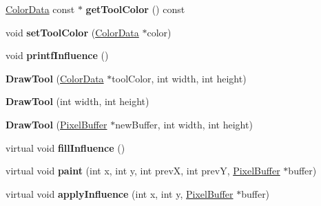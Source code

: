 \begin{DoxyCompactItemize}
\item 
\hypertarget{classDrawTool_ac19eb962a24f0bd60b0854079424c7ec}{\hyperlink{classColorData}{Color\-Data} const $\ast$ {\bfseries get\-Tool\-Color} () const }\label{classDrawTool_ac19eb962a24f0bd60b0854079424c7ec}

\item 
\hypertarget{classDrawTool_a7f7097be5f6beb7b3f6ce437785cac7a}{void {\bfseries set\-Tool\-Color} (\hyperlink{classColorData}{Color\-Data} $\ast$color)}\label{classDrawTool_a7f7097be5f6beb7b3f6ce437785cac7a}

\item 
\hypertarget{classDrawTool_a04f57381cb6c71d90a66e905b46f424c}{void {\bfseries printf\-Influence} ()}\label{classDrawTool_a04f57381cb6c71d90a66e905b46f424c}

\item 
\hypertarget{classDrawTool_aa21e3a5373ba9e4e43d6e56eec82b32d}{{\bfseries Draw\-Tool} (\hyperlink{classColorData}{Color\-Data} $\ast$tool\-Color, int width, int height)}\label{classDrawTool_aa21e3a5373ba9e4e43d6e56eec82b32d}

\item 
\hypertarget{classDrawTool_aa1816d6699a835d9c7619ee5c97be9d1}{{\bfseries Draw\-Tool} (int width, int height)}\label{classDrawTool_aa1816d6699a835d9c7619ee5c97be9d1}

\item 
\hypertarget{classDrawTool_a521ad2f183dd3354de1dd163140e8b1d}{{\bfseries Draw\-Tool} (\hyperlink{classPixelBuffer}{Pixel\-Buffer} $\ast$new\-Buffer, int width, int height)}\label{classDrawTool_a521ad2f183dd3354de1dd163140e8b1d}

\item 
\hypertarget{classDrawTool_ad6f6c40a7aab69d634f7a9df001adb3e}{virtual void {\bfseries fill\-Influence} ()}\label{classDrawTool_ad6f6c40a7aab69d634f7a9df001adb3e}

\item 
\hypertarget{classDrawTool_ad34e979d9b73f5401ed52c92fb984d41}{virtual void {\bfseries paint} (int x, int y, int prev\-X, int prev\-Y, \hyperlink{classPixelBuffer}{Pixel\-Buffer} $\ast$buffer)}\label{classDrawTool_ad34e979d9b73f5401ed52c92fb984d41}

\item 
\hypertarget{classDrawTool_a6355d9df1008511a54b687a0850c4866}{virtual void {\bfseries apply\-Influence} (int x, int y, \hyperlink{classPixelBuffer}{Pixel\-Buffer} $\ast$buffer)}\label{classDrawTool_a6355d9df1008511a54b687a0850c4866}


\end{DoxyCompactItemize}
